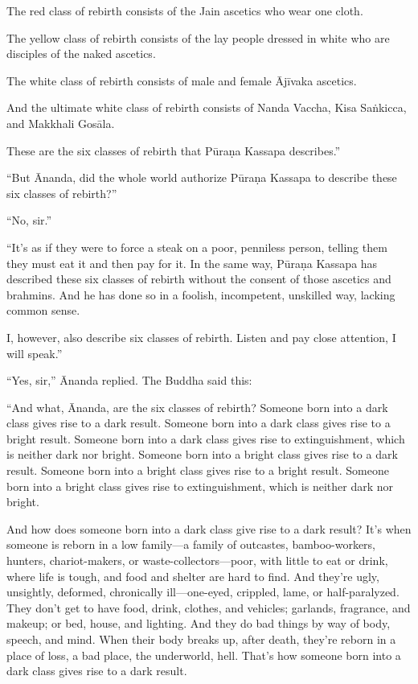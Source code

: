 \documentclass[12pt,openany]{book}%
\begin{document}
The red class of rebirth consists of the Jain ascetics who wear one cloth. 

The yellow class of rebirth consists of the lay people dressed in white who are disciples of the naked ascetics. 

The white class of rebirth consists of male and female \textsanskrit{Ājīvaka} ascetics. 

And the ultimate white class of rebirth consists of Nanda Vaccha, Kisa \textsanskrit{Saṅkicca}, and Makkhali \textsanskrit{Gosāla}. 

These are the six classes of rebirth that \textsanskrit{Pūraṇa} Kassapa describes.” 

“But Ānanda, did the whole world authorize \textsanskrit{Pūraṇa} Kassapa to describe these six classes of rebirth?” 

“No, sir.” 

“It’s as if they were to force a steak on a poor, penniless person, telling them they must eat it and then pay for it. In the same way, \textsanskrit{Pūraṇa} Kassapa has described these six classes of rebirth without the consent of those ascetics and brahmins. And he has done so in a foolish, incompetent, unskilled way, lacking common sense. 

I, however, also describe six classes of rebirth. Listen and pay close attention, I will speak.” 

“Yes, sir,” Ānanda replied. The Buddha said this: 

“And what, Ānanda, are the six classes of rebirth? Someone born into a dark class gives rise to a dark result. Someone born into a dark class gives rise to a bright result. Someone born into a dark class gives rise to extinguishment, which is neither dark nor bright. Someone born into a bright class gives rise to a dark result. Someone born into a bright class gives rise to a bright result. Someone born into a bright class gives rise to extinguishment, which is neither dark nor bright. 

And how does someone born into a dark class give rise to a dark result? It’s when someone is reborn in a low family—a family of outcastes, bamboo-workers, hunters, chariot-makers, or waste-collectors—poor, with little to eat or drink, where life is tough, and food and shelter are hard to find. And they’re ugly, unsightly, deformed, chronically ill—one-eyed, crippled, lame, or half-paralyzed. They don’t get to have food, drink, clothes, and vehicles; garlands, fragrance, and makeup; or bed, house, and lighting. And they do bad things by way of body, speech, and mind. When their body breaks up, after death, they’re reborn in a place of loss, a bad place, the underworld, hell. That’s how someone born into a dark class gives rise to a dark result. 
\end{document}
